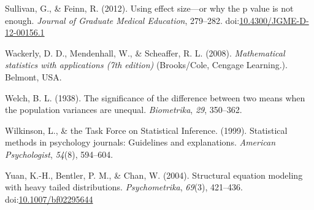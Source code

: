 \documentclass[
  man,floatsintext]{apa6}
\begin{document}
\leavevmode\hypertarget{ref-Sullivan_Feinn_2012}{}%
Sullivan, G., \& Feinn, R. (2012). Using effect size---or why the p value is not enough. \emph{Journal of Graduate Medical Education}, 279--282. doi:\href{https://doi.org/10.4300/JGME-D-12-00156.1}{10.4300/JGME-D-12-00156.1}

\leavevmode\hypertarget{ref-Wackerly_et_al_2008}{}%
Wackerly, D. D., Mendenhall, W., \& Scheaffer, R. L. (2008). \emph{Mathematical statistics with applications (7th edition)} (Brooks/Cole, Cengage Learning.). Belmont, USA.

\leavevmode\hypertarget{ref-Welch_1938}{}%
Welch, B. L. (1938). The significance of the difference between two means when the population variances are unequal. \emph{Biometrika}, \emph{29}, 350--362.

\leavevmode\hypertarget{ref-Wilkinson_1999}{}%
Wilkinson, L., \& the Task Force on Statistical Inference. (1999). Statistical methods in psychology journals: Guidelines and explanations. \emph{American Psychologist}, \emph{54}(8), 594--604.

\leavevmode\hypertarget{ref-Yuan_et_al_2004}{}%
Yuan, K.-H., Bentler, P. M., \& Chan, W. (2004). Structural equation modeling with heavy tailed distributions. \emph{Psychometrika}, \emph{69}(3), 421--436. doi:\href{https://doi.org/10.1007/bf02295644}{10.1007/bf02295644}
\end{document}
